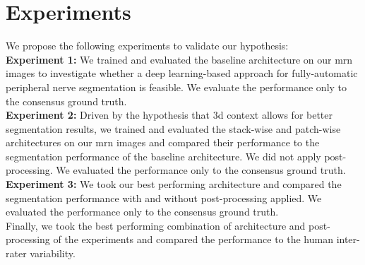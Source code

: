 \section{Experiments} \label{sec:experiments}
We propose the following experiments to validate our hypothesis:\\

\textbf{Experiment 1:} We trained and evaluated the baseline architecture on our \gls{mrn} images to investigate whether a deep learning-based approach for fully-automatic peripheral nerve segmentation is feasible. We evaluate the performance only to the consensus ground truth.\\

\textbf{Experiment 2:} Driven by the hypothesis that \gls{3d} context allows for better segmentation results, we trained and evaluated the stack-wise and patch-wise architectures on our \gls{mrn} images and compared their performance to the segmentation performance of the baseline architecture. We did not apply post-processing. We evaluated the performance only to the consensus ground truth.\\

\textbf{Experiment 3:} We took our best performing architecture and compared the segmentation performance with and without post-processing applied. We evaluated the performance only to the consensus ground truth.\\

Finally, we took the best performing combination of architecture and post-processing of the experiments and compared the performance to the human inter-rater variability.

\endinput